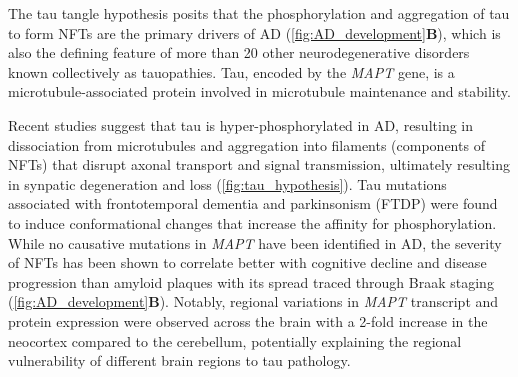 \newpage
{} 
The tau tangle hypothesis posits that the phosphorylation and aggregation of tau to form NFTs are the primary drivers of AD\cite{KS1986} (\cref{fig:AD_development}\textbf{B}), which is also the defining feature of more than 20 other neurodegenerative disorders known collectively as tauopathies\cite{Orr2017}. Tau, encoded by the \textit{MAPT} gene, is a microtubule-associated protein involved in microtubule maintenance and stability. 

Recent studies suggest that tau is hyper-phosphorylated in AD, resulting in dissociation from microtubules and aggregation into filaments\cite{Grundke-Iqbal1986,Grundke-Iqbal1986a} (components of NFTs) that disrupt axonal transport and signal transmission, ultimately resulting in synpatic degeneration and loss\cite{Coomans2021} (\cref{fig:tau_hypothesis}). Tau mutations associated with frontotemporal dementia and parkinsonism (FTDP)  were found to induce conformational changes that increase the affinity for phosphorylation\cite{Alonso2004}. While no causative mutations in \textit{MAPT} have been identified in AD, the severity of NFTs has been shown to correlate better with cognitive decline and disease progression than amyloid plaques \cite{Serrano-Pozo2016,Giannakopoulos2003,PV1992} with its spread traced through Braak staging \cite{H1991} (\cref{fig:AD_development}\textbf{B}). Notably, regional variations in \textit{MAPT} transcript and protein expression were observed across the brain with a 2-fold increase in the neocortex compared to the cerebellum, potentially explaining the regional vulnerability of different brain regions to tau pathology\cite{Trabzuni2012}. 


